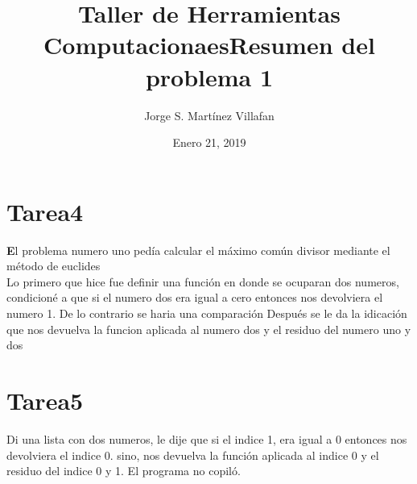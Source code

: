 \documentclass[letterpaper, 12pt, oneside]{article}%
\title{\Huge Taller de Herramientas Computacionaes}
\author{Jorge S. Martínez Villafan}
\date{Enero 21, 2019}
\begin{document}
\maketitle
\newpage
\title{Resumen del problema 1}
\section{Tarea4}
\textbf El problema numero uno pedía calcular el máximo común divisor mediante el método de euclides\\
Lo primero que hice fue definir una función en donde se ocuparan dos numeros, condicioné a que si el numero dos era igual a cero entonces nos devolviera el numero 1. De lo contrario se haria una comparación
Después se le da la idicación que nos devuelva la funcion aplicada al numero dos y el residuo del numero uno y dos

\section{Tarea5}
Di una lista con dos numeros, le dije que si el indice 1, era igual a 0 entonces nos devolviera el indice 0. sino, nos devuelva la función aplicada al indice 0 y el residuo del indice 0 y 1. El programa no copiló.
\end{document}
